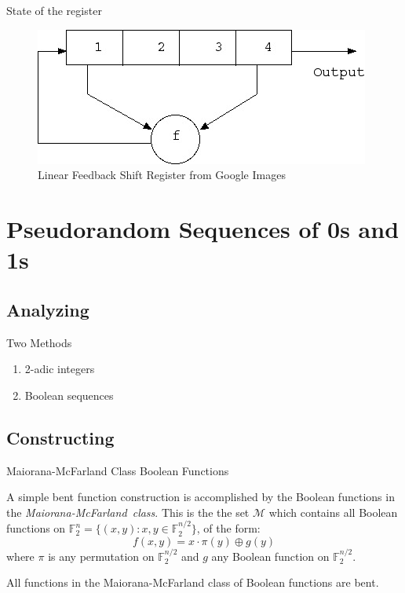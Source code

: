\documentclass{beamer}
\def\gftwo{\mathbb{F}_2}
\begin{document}
\begin{frame}{State of the register}
  \begin{figure}[h!]
    \centering
    \includegraphics[totalheight=0.5\textheight]{lfsr.jpg}
    \caption{Linear Feedback Shift Register from Google Images}
  \end{figure}
\end{frame}

\section{Pseudorandom Sequences of 0s and 1s}
\subsection{Analyzing}
\begin{frame}{Two Methods}
  \begin{enumerate}[1.]
    \item 2-adic integers
    \item Boolean sequences
  \end{enumerate}
\end{frame}

\subsection{Constructing}
\begin{frame}{Maiorana-McFarland Class Boolean Functions}
  \par A simple bent function construction is accomplished by the Boolean
  functions in the {\em Maiorana-McFarland\ class}. This is the the set
  $\mathcal{M}$ which contains all Boolean functions on
  $\gftwo^n=\{(x,y):x,y\in\gftwo^{n/2}\}$, of the form:
    \[
    f(x,y)=x\cdot\pi(y)\oplus g(y)
    \]
  where $\pi$ is any permutation on $\gftwo^{n/2}$ and $g$ any Boolean
  function on $\gftwo^{n/2}$.\\
  
  \par All functions in the Maiorana-McFarland class of Boolean functions are
  bent.
\end{frame}
  
\end{document}
